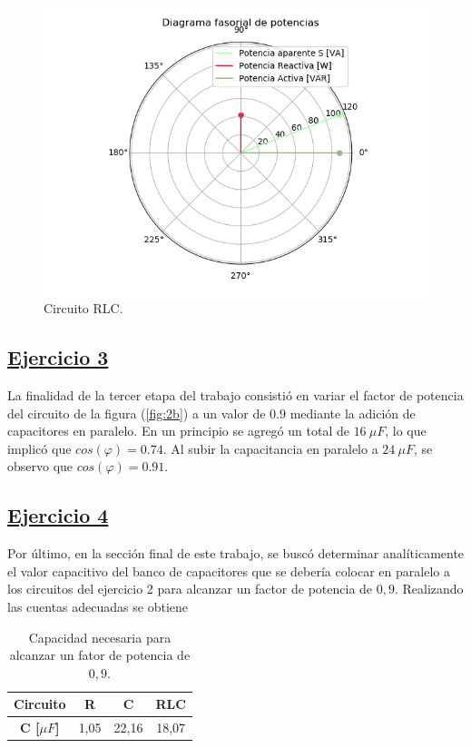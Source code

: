 \documentclass[a4paper]{article}
\begin{document}
\begin{figure}[H]
\begin{minipage}{.5\textwidth}
\end{minipage}\\
\begin{minipage}{.5\textwidth}
  \centering
  \includegraphics[width=1.2\linewidth]{Diag-Fas-2C}
  \caption{Circuito RLC.}
\end{minipage}
\end{figure}

\subsection*{\underline{Ejercicio 3}}
La finalidad de la tercer etapa del trabajo consistió en variar el factor de potencia del circuito de la figura (\ref{fig:2b}) a un valor de $ 0.9 $ mediante la adición de capacitores en paralelo. En un principio se agregó un total de $ 16 \ \mu F$, lo que implicó que $ cos \left(\varphi \right) = 0.74 $. Al subir la capacitancia en paralelo a $ 24 \ \mu F$, se observo que $ cos \left(\varphi \right) = 0.91 $.

\subsection*{\underline{Ejercicio 4}}
Por último, en la sección final de este trabajo, se buscó determinar analíticamente el valor capacitivo del banco de capacitores que se debería colocar en paralelo a los circuitos del ejercicio 2 para alcanzar un factor de potencia de $ 0,9 $. Realizando las cuentas adecuadas se obtiene
\begin{table}[H]
\centering
\begin{tabular}{|c|c|c|c|}
\hline
\textbf{Circuito} & \textbf{R} & \textbf{C} & \textbf{RLC} \\ \hline
\textbf{C [$ \mu F $]}        & 1,05      & 22,16       & 18,07         \\ \hline
\end{tabular}
\caption{Capacidad necesaria para alcanzar un fator de potencia de $ 0,9 $.}
\end{table} 
\end{document}
